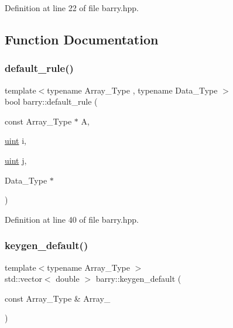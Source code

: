 Definition at line 22 of file barry.\+hpp.



\subsection{Function Documentation}
\mbox{\label{namespacebarry_a1cb28b501bc7f88c0b3d68d51ad672e1}} 
\subsubsection{\texorpdfstring{default\+\_\+rule()}{default\_rule()}}
{\footnotesize\ttfamily template$<$typename Array\+\_\+\+Type , typename Data\+\_\+\+Type $>$ \\
bool barry\+::default\+\_\+rule (\begin{DoxyParamCaption}\item[{const Array\+\_\+\+Type $\ast$}]{A,  }\item[{\hyperlink{namespacebarry_a11dfc53ddb4672278319aa04f1e09a6c}{uint}}]{i,  }\item[{\hyperlink{namespacebarry_a11dfc53ddb4672278319aa04f1e09a6c}{uint}}]{j,  }\item[{Data\+\_\+\+Type $\ast$}]{ }\end{DoxyParamCaption})\hspace{0.3cm}{\ttfamily [inline]}}



Definition at line 40 of file barry.\+hpp.

\mbox{\label{namespacebarry_a22bfc7c4a1f5b5922edfd1101b8ffe3d}} 
\subsubsection{\texorpdfstring{keygen\+\_\+default()}{keygen\_default()}}
{\footnotesize\ttfamily template$<$typename Array\+\_\+\+Type $>$ \\
std\+::vector$<$ double $>$ barry\+::keygen\+\_\+default (\begin{DoxyParamCaption}\item[{const Array\+\_\+\+Type \&}]{Array\+\_\+ }\end{DoxyParamCaption})\hspace{0.3cm}{\ttfamily [inline]}}




